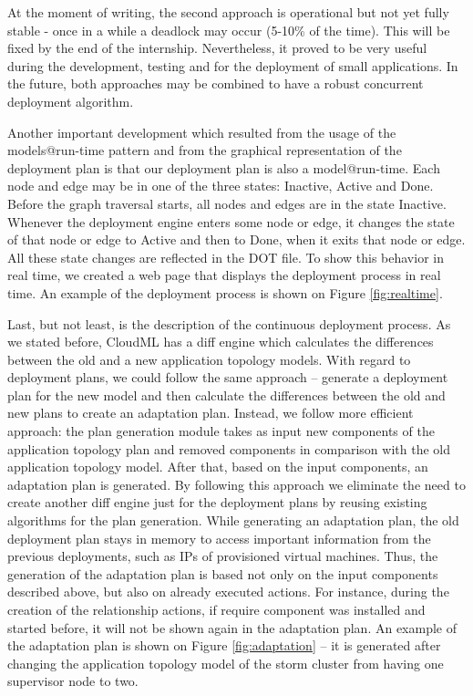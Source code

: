 \noindent

\noindent At the moment of writing, the second approach is operational but not yet fully stable - once in a while a deadlock may occur (5-10\% of the time). This will be fixed by the end of the internship. Nevertheless, it proved to be very useful during the development, testing and for the deployment of small applications. In the future, both approaches may be combined to have a robust concurrent deployment algorithm.

\noindent Another important development which resulted from the usage of the models@run-time pattern and from the graphical representation of the deployment plan is that our deployment plan is also a model@run-time. Each node and edge may be in one of the three states: Inactive, Active and Done. Before the graph traversal starts, all nodes and edges are in the state Inactive. Whenever the deployment engine enters some node or edge, it changes the state of that node or edge to Active and then to Done, when it exits that node or edge. All these state changes are reflected in the DOT file. To show this behavior in real time, we created a web page that displays the deployment process in real time. An example of the deployment process is shown on Figure \ref{fig:realtime}.

\noindent Last, but not least, is the description of the continuous deployment process. As we stated before, CloudML has a diff engine which calculates the differences between the old and a new application topology models. With regard to deployment plans, we could follow the same approach -- generate a deployment plan for the new model and then calculate the differences between the old and new plans to create an adaptation plan. Instead, we follow more efficient approach: the plan generation module takes as input new components of the application topology plan and removed components in comparison with the old application topology model. After that, based on the input components, an adaptation plan is generated. By following this approach we eliminate the need to create another diff engine just for the deployment plans by reusing existing algorithms for the plan generation. While generating an adaptation plan, the old deployment plan stays in memory to access important information from the previous deployments, such as IPs of provisioned virtual machines. Thus, the generation of the adaptation plan is based not only on the input components described above, but also on already executed actions. For instance, during the creation of the relationship actions, if require component was installed and started before, it will not be shown again in the adaptation plan. An example of the adaptation plan is shown on Figure \ref{fig:adaptation} -- it is generated after changing the application topology model of the storm cluster from having one supervisor node to two.

